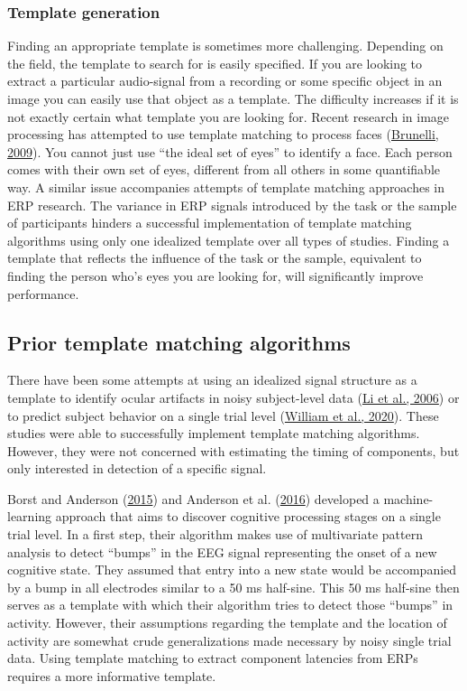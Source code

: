 \documentclass[
  man]{apa7}
\begin{document}
\hypertarget{template-generation}{%
\subsubsection{Template generation}\label{template-generation}}

Finding an appropriate template is sometimes more challenging. Depending on the field, the template to search for is easily specified. If you are looking to extract a particular audio-signal from a recording or some specific object in an image you can easily use that object as a template. The difficulty increases if it is not exactly certain what template you are looking for. Recent research in image processing has attempted to use template matching to process faces (\protect\hyperlink{ref-brunelli2009template}{Brunelli, 2009}). You cannot just use ``the ideal set of eyes'' to identify a face. Each person comes with their own set of eyes, different from all others in some quantifiable way. A similar issue accompanies attempts of template matching approaches in ERP research. The variance in ERP signals introduced by the task or the sample of participants hinders a successful implementation of template matching algorithms using only one idealized template over all types of studies. Finding a template that reflects the influence of the task or the sample, equivalent to finding the person who's eyes you are looking for, will significantly improve performance.

\hypertarget{prior-template-matching-algorithms}{%
\subsection{Prior template matching algorithms}\label{prior-template-matching-algorithms}}

There have been some attempts at using an idealized signal structure as a template to identify ocular artifacts in noisy subject-level data (\protect\hyperlink{ref-li2006automatic}{Li et al., 2006}) or to predict subject behavior on a single trial level (\protect\hyperlink{ref-william2020erp}{William et al., 2020}). These studies were able to successfully implement template matching algorithms. However, they were not concerned with estimating the timing of components, but only interested in detection of a specific signal.

Borst and Anderson (\protect\hyperlink{ref-borst2015discovery}{2015}) and Anderson et al. (\protect\hyperlink{ref-anderson2016discovery}{2016}) developed a machine-learning approach that aims to discover cognitive processing stages on a single trial level. In a first step, their algorithm makes use of multivariate pattern analysis to detect ``bumps'' in the EEG signal representing the onset of a new cognitive state. They assumed that entry into a new state would be accompanied by a bump in all electrodes similar to a 50 ms half-sine. This 50 ms half-sine then serves as a template with which their algorithm tries to detect those ``bumps'' in activity. However, their assumptions regarding the template and the location of activity are somewhat crude generalizations made necessary by noisy single trial data. Using template matching to extract component latencies from ERPs requires a more informative template.
\end{document}
